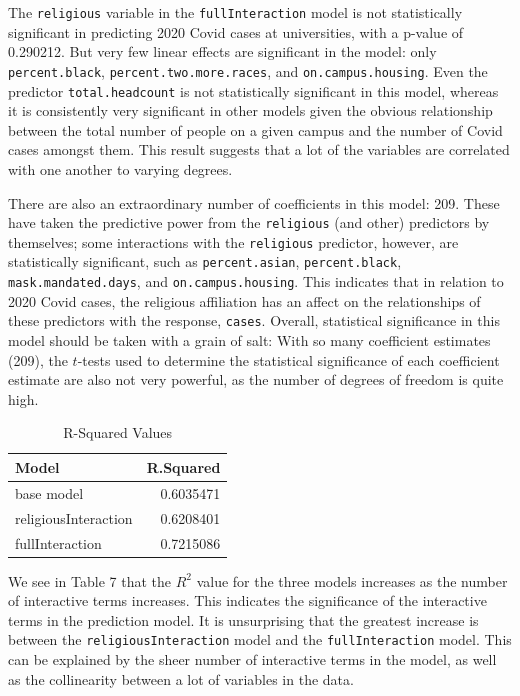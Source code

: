 \documentclass[
]{article}
\begin{document}
The \texttt{religious} variable in the \texttt{fullInteraction} model is
not statistically significant in predicting 2020 Covid cases at
universities, with a p-value of 0.290212. But very few linear effects
are significant in the model: only \texttt{percent.black},
\texttt{percent.two.more.races}, and \texttt{on.campus.housing}. Even
the predictor \texttt{total.headcount} is not statistically significant
in this model, whereas it is consistently very significant in other
models given the obvious relationship between the total number of people
on a given campus and the number of Covid cases amongst them. This
result suggests that a lot of the variables are correlated with one
another to varying degrees.

There are also an extraordinary number of coefficients in this model:
209. These have taken the predictive power from the \texttt{religious}
(and other) predictors by themselves; some interactions with the
\texttt{religious} predictor, however, are statistically significant,
such as \texttt{percent.asian}, \texttt{percent.black},
\texttt{mask.mandated.days}, and \texttt{on.campus.housing}. This
indicates that in relation to 2020 Covid cases, the religious
affiliation has an affect on the relationships of these predictors with
the response, \texttt{cases}. Overall, statistical significance in this
model should be taken with a grain of salt: With so many coefficient
estimates (209), the \(t\)-tests used to determine the statistical
significance of each coefficient estimate are also not very powerful, as
the number of degrees of freedom is quite high.

\begin{table}

\caption{\label{tab:unnamed-chunk-21}R-Squared Values}
\centering
\begin{tabular}[t]{l|r}
\hline
Model & R.Squared\\
\hline
base model & 0.6035471\\
\hline
religiousInteraction & 0.6208401\\
\hline
fullInteraction & 0.7215086\\
\hline
\end{tabular}
\end{table}

We see in Table 7 that the \(R^2\) value for the three models increases
as the number of interactive terms increases. This indicates the
significance of the interactive terms in the prediction model. It is
unsurprising that the greatest increase is between the
\texttt{religiousInteraction} model and the \texttt{fullInteraction}
model. This can be explained by the sheer number of interactive terms in
the model, as well as the collinearity between a lot of variables in the
data.
\end{document}
